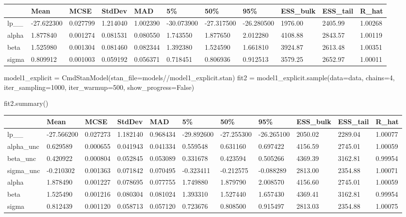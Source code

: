 \documentclass[
  letterpaper,
  DIV=11,
  numbers=noendperiod]{scrartcl}
\newenvironment{Shaded}{\begin{snugshade}}{\end{snugshade}}
\newcommand{\DecValTok}[1]{\textcolor[rgb]{0.68,0.00,0.00}{#1}}
\newcommand{\NormalTok}[1]{\textcolor[rgb]{0.00,0.23,0.31}{#1}}
\newcommand{\OperatorTok}[1]{\textcolor[rgb]{0.37,0.37,0.37}{#1}}
\newcommand{\StringTok}[1]{\textcolor[rgb]{0.13,0.47,0.30}{#1}}
\newcommand{\VariableTok}[1]{\textcolor[rgb]{0.07,0.07,0.07}{#1}}
\begin{document}
\begin{longtable}[]{@{}lllllllllll@{}}
\toprule\noalign{}
& Mean & MCSE & StdDev & MAD & 5\% & 50\% & 95\% & ESS\_bulk & ESS\_tail
& R\_hat \\
\midrule\noalign{}
\endhead
\bottomrule\noalign{}
\endlastfoot
lp\_\_ & -27.622300 & 0.027799 & 1.214040 & 1.002390 & -30.073900 &
-27.317500 & -26.280500 & 1976.00 & 2405.99 & 1.00268 \\
alpha & 1.877840 & 0.001274 & 0.081531 & 0.080550 & 1.743550 & 1.877650
& 2.012280 & 4108.88 & 2843.57 & 1.00119 \\
beta & 1.525980 & 0.001304 & 0.081460 & 0.082344 & 1.392380 & 1.524590 &
1.661810 & 3924.87 & 2613.48 & 1.00351 \\
sigma & 0.809912 & 0.001003 & 0.059192 & 0.056371 & 0.718451 & 0.806936
& 0.912513 & 3579.25 & 2652.97 & 1.00011 \\
\end{longtable}

\begin{Shaded}
\begin{Highlighting}[]
\NormalTok{model1\_explicit }\OperatorTok{=}\NormalTok{ CmdStanModel(stan\_file}\OperatorTok{=}\StringTok{\textquotesingle{}models//model1\_explicit.stan\textquotesingle{}}\NormalTok{)}
\NormalTok{fit2 }\OperatorTok{=}\NormalTok{ model1\_explicit.sample(data}\OperatorTok{=}\NormalTok{data, chains}\OperatorTok{=}\DecValTok{4}\NormalTok{, iter\_sampling}\OperatorTok{=}\DecValTok{1000}\NormalTok{, iter\_warmup}\OperatorTok{=}\DecValTok{500}\NormalTok{, show\_progress}\OperatorTok{=}\VariableTok{False}\NormalTok{)}

\NormalTok{fit2.summary()}
\end{Highlighting}
\end{Shaded}

\begin{longtable}[]{@{}lllllllllll@{}}
\toprule\noalign{}
& Mean & MCSE & StdDev & MAD & 5\% & 50\% & 95\% & ESS\_bulk & ESS\_tail
& R\_hat \\
\midrule\noalign{}
\endhead
\bottomrule\noalign{}
\endlastfoot
lp\_\_ & -27.566200 & 0.027273 & 1.182140 & 0.968434 & -29.892600 &
-27.255300 & -26.265100 & 2050.02 & 2289.04 & 1.00077 \\
alpha\_unc & 0.629589 & 0.000655 & 0.041943 & 0.041334 & 0.559548 &
0.631160 & 0.697422 & 4156.59 & 2745.01 & 1.00059 \\
beta\_unc & 0.420922 & 0.000804 & 0.052845 & 0.053089 & 0.331678 &
0.423594 & 0.505266 & 4369.39 & 3162.81 & 0.99954 \\
sigma\_unc & -0.210302 & 0.001363 & 0.071842 & 0.070495 & -0.323411 &
-0.212575 & -0.088289 & 2813.00 & 2354.88 & 1.00071 \\
alpha & 1.878490 & 0.001227 & 0.078695 & 0.077755 & 1.749880 & 1.879790
& 2.008570 & 4156.60 & 2745.01 & 1.00059 \\
beta & 1.525490 & 0.001216 & 0.080304 & 0.081024 & 1.393310 & 1.527440 &
1.657430 & 4369.41 & 3162.81 & 0.99954 \\
sigma & 0.812439 & 0.001120 & 0.058713 & 0.057120 & 0.723676 & 0.808500
& 0.915497 & 2813.03 & 2354.88 & 1.00075 \\
\end{longtable}
\end{document}
